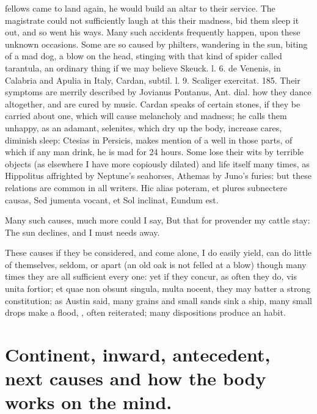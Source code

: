 {fellows came to land again, he would build an altar to their
service. The magistrate could not sufficiently laugh at this their
madness, bid them sleep it out, and so went his ways. Many such
accidents frequently happen, upon these unknown occasions. Some are so
caused by philters, wandering in the sun, biting of a mad dog, a blow
on the head, stinging with that kind of spider called tarantula, an
ordinary thing if we may believe Skeuck. l. 6. de Venenis, in Calabria
and Apulia in Italy, Cardan, subtil. l. 9. Scaliger exercitat. 185.
Their symptoms are merrily described by Jovianus Pontanus, Ant. dial.
how they dance altogether, and are cured by music. Cardan speaks
of certain stones, if they be carried about one, which will cause
melancholy and madness; he calls them unhappy, as an adamant,
selenites, \etc{} which dry up the body, increase cares, diminish sleep:
Ctesias in Persicis, makes mention of a well in those parts, of which
if any man drink, he is mad for 24 hours. Some lose their wits by
terrible objects (as elsewhere I have more copiously dilated) and
life itself many times, as Hippolitus affrighted by Neptune's
seahorses, Athemas by Juno's furies: but these relations are common in
all writers.
Hic alias poteram, et plures subnectere causas,
Sed jumenta vocant, et Sol inclinat, Eundum est.

Many such causes, much more could I say,
But that for provender my cattle stay:
The sun declines, and I must needs away.

These causes if they be considered, and come alone, I do easily yield,
can do little of themselves, seldom, or apart (an old oak is not felled
at a blow) though many times they are all sufficient every one: yet if
they concur, as often they do, vis unita fortior; et quae non obsunt
singula, multa nocent, they may batter a strong constitution; as
Austin said, many grains and small sands sink a ship, many small
drops make a flood, \etc{}, often reiterated; many dispositions produce an
habit.


\section{Continent, inward, antecedent, next causes and how the body works on the mind.}

}
